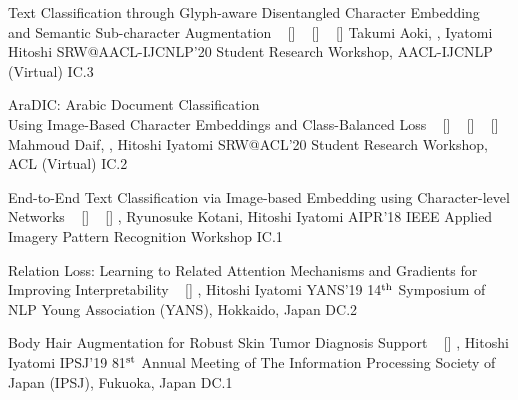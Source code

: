 \begin{publications}
    \publication
    {Text Classification through Glyph-aware Disentangled Character Embedding \\ and Semantic Sub-character Augmentation}
    {
    ~ [\href{https://aclanthology.org/2020.aacl-srw.1/}{\small{\linkSymbol}}]
    ~ [\href{https://arxiv.org/abs/2011.04184}{\small{\arxivSymbol}}]
    ~ [\href{https://github.com/IyatomiLab/GDCE-SSA}{\small{\githubSymbol}}]
    }
    {Takumi Aoki, \underline{}, Iyatomi Hitoshi}
    {SRW@AACL-IJCNLP'20} {Student Research Workshop, AACL-IJCNLP (Virtual)} {IC.3}

    \publication
    {AraDIC: Arabic Document Classification \\ Using Image-Based Character Embeddings and Class-Balanced Loss}
    {
    ~ [\href{https://aclanthology.org/2020.acl-srw.29/}{\small{\linkSymbol}}]
    ~ [\href{https://arxiv.org/abs/2006.11586}{\small{\arxivSymbol}}]
    ~ [\href{https://github.com/IyatomiLab/GDCE-SSA}{\small{\githubSymbol}}]
    }
    {Mahmoud Daif, \underline{}, Hitoshi Iyatomi}
    {SRW@ACL'20} {Student Research Workshop, ACL (Virtual)} {IC.2}

    \publication
    {End-to-End Text Classification via Image-based Embedding using Character-level Networks}
    {
    ~ [\href{https://ieeexplore.ieee.org/document/8707407}{\small{\linkSymbol}}]
    ~ [\href{https://arxiv.org/abs/1810.03595}{\small{\arxivSymbol}}]
    }
    {\underline{}, Ryunosuke Kotani, Hitoshi Iyatomi}
    {AIPR'18} {IEEE Applied Imagery Pattern Recognition Workshop} {IC.1}

    \publication
    {Relation Loss: Learning to Related Attention Mechanisms and Gradients for Improving Interpretability}
    {
    ~ [\href{https://www.hosei.ac.jp/gs/NEWS/zaigaku/koganei/20190920/}{\small{\linkSymbol}}]
    }
    {\underline{}, Hitoshi Iyatomi}
    {YANS'19} {14$^{\textrm{\scriptsize th}}$ Symposium of NLP Young Association (YANS), Hokkaido, Japan} {DC.2}

    \publication
    {Body Hair Augmentation for Robust Skin Tumor Diagnosis Support}
    {
    ~ [\href{https://www.hosei.ac.jp/gs/NEWS/topics/jusho/190411_4/}{\small{\linkSymbol}}]
    }
    {\underline{}, Hitoshi Iyatomi}
    {IPSJ'19} {81$^{\textrm{\scriptsize st}}$ Annual Meeting of The Information Processing Society of Japan (IPSJ), Fukuoka, Japan} {DC.1}

\end{publications}
